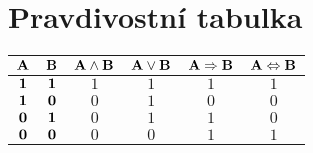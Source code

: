 \documentclass[main.tex]{subfiles}
\begin{document}
\section*{Pravdivostní tabulka}
\begin{tabular}{cc|cccc}
    $\mathbf{A}$	&	$\mathbf{B}$	&	$\mathbf{A \wedge B}$	&	$\mathbf{A \vee B}$	&	$\mathbf{A \Rightarrow B}$	&	$\mathbf{A \Leftrightarrow B}$	\\\hline
    $\mathbf{1}$	&	$\mathbf{1}$	&	$1$									&	$1$								&	$1$											&	$1$													\\
    $\mathbf{1}$	&	$\mathbf{0}$	&	$0$									&	$1$								&	$0$											&	$0$													\\
    $\mathbf{0}$	&	$\mathbf{1}$	&	$0$									&	$1$								&	$1$											&	$0$													\\
    $\mathbf{0}$	&	$\mathbf{0}$	&	$0$									&	$0$								&	$1$											&	$1$													\\
  \end{tabular}
\end{document}
